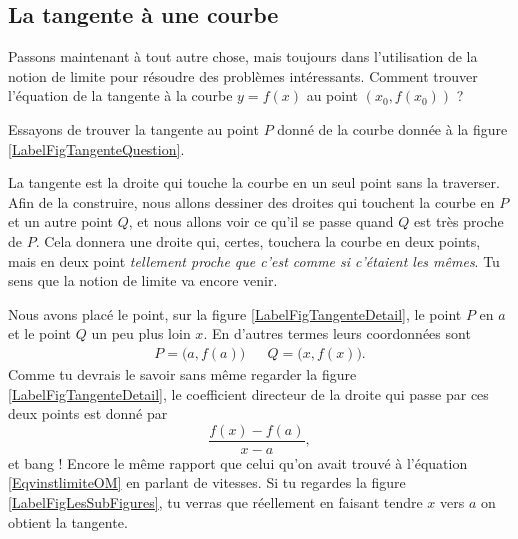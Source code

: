 \subsection{La tangente à une courbe}

Passons maintenant à tout autre chose, mais toujours dans l'utilisation de la notion de limite pour résoudre des problèmes intéressants. Comment trouver l'équation de la tangente à la courbe $y=f(x)$ au point $(x_0,f(x_0))$ ?

Essayons de trouver la tangente au point $P$ donné de la courbe donnée à la figure \ref{LabelFigTangenteQuestion}.

\newcommand{\CaptionFigTangenteQuestion}{Comment trouver la tangente à la courbe au point $P$ ?}


La tangente est la droite qui touche la courbe en un seul point sans la traverser. Afin de la construire, nous allons dessiner des droites qui touchent la courbe en $P$ et un autre point $Q$, et nous allons voir ce qu'il se passe quand $Q$ est très proche de $P$. Cela donnera une droite qui, certes, touchera la courbe en deux points, mais en deux point \emph{tellement proche que c'est comme si c'étaient les mêmes}. Tu sens que la notion de limite va encore venir.


\newcommand{\CaptionFigTangenteDetail}{Traçons d'abord une corde entre le point $P$ et un point $Q$ un peu plus loin.}



Nous avons placé le point, sur la figure \ref{LabelFigTangenteDetail}, le point $P$ en $a$ et le point $Q$ un peu plus loin $x$. En d'autres termes leurs coordonnées sont
\begin{align}
	P=\big(a,f(a)\big)&& Q=\big(x,f(x)\big).
\end{align}
Comme tu devrais le savoir sans même regarder la figure \ref{LabelFigTangenteDetail}, le coefficient directeur de la droite qui passe par ces deux points est donné par
\begin{equation}
	\frac{ f(x)-f(a) }{ x-a },
\end{equation}
et bang ! Encore le même rapport que celui qu'on avait trouvé à l'équation \eqref{EqvinstlimiteOM} en parlant de vitesses. Si tu regardes la figure \ref{LabelFigLesSubFigures}, tu verras que réellement en faisant tendre $x$ vers $a$ on obtient la tangente.

